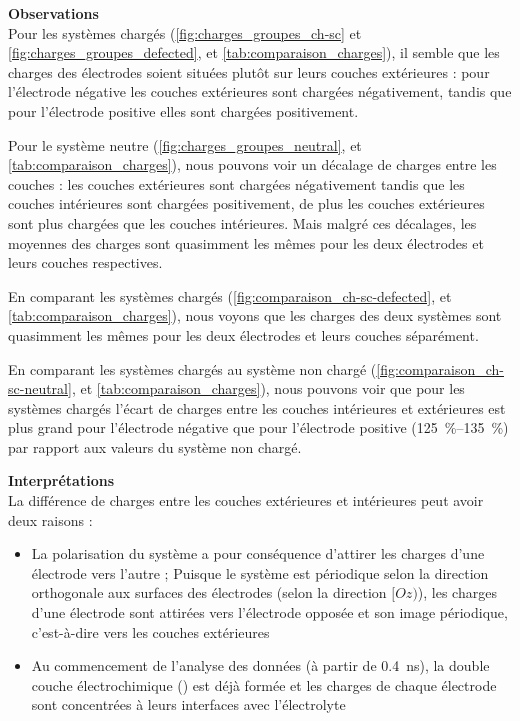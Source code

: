 \clearpage

\textbf{Observations}\\
Pour les systèmes chargés (\autoref{fig:charges_groupes_ch-sc} et \ref{fig:charges_groupes_defected}, et \autoref{tab:comparaison_charges}), il semble que les charges des électrodes soient situées plutôt sur leurs couches extérieures : pour l'électrode négative les couches extérieures sont chargées négativement, tandis que pour l'électrode positive elles sont chargées positivement.

Pour le système neutre (\autoref{fig:charges_groupes_neutral}, et \autoref{tab:comparaison_charges}), nous pouvons voir un décalage de charges entre les couches : les couches extérieures sont chargées négativement tandis que les couches intérieures sont chargées positivement, de plus les couches extérieures sont plus chargées que les couches intérieures. Mais malgré ces décalages, les moyennes des charges sont quasimment les mêmes pour les deux électrodes et leurs couches respectives.

En comparant les systèmes chargés (\autoref{fig:comparaison_ch-sc-defected}, et \autoref{tab:comparaison_charges}), nous voyons que les charges des deux systèmes sont quasimment les mêmes pour les deux électrodes et leurs couches séparément.

En comparant les systèmes chargés au système non chargé (\autoref{fig:comparaison_ch-sc-neutral}, et \autoref{tab:comparaison_charges}), nous pouvons voir que pour les systèmes chargés l'écart de charges entre les couches intérieures et extérieures est plus grand pour l'électrode négative que pour l'électrode positive (\qtyrange[range-units = single]{125}{135}{\percent}) par rapport aux valeurs du système non chargé.

\textbf{Interprétations}\\
La différence de charges entre les couches extérieures et intérieures peut avoir deux raisons :
\begin{itemize}
    \item La polarisation du système a pour conséquence d'attirer les charges d'une électrode vers l'autre ; Puisque le système est périodique selon la direction orthogonale aux surfaces des électrodes (selon la direction $[Oz)$), les charges d'une électrode sont attirées vers l'électrode opposée et son image périodique, c'est-à-dire vers les couches extérieures
    \item Au commencement de l'analyse des données (à partir de \qty{0.4}{\nano \second}), la double couche électrochimique (\edl{}) est déjà formée et les charges de chaque électrode sont concentrées à leurs interfaces avec l'électrolyte
\end{itemize}

